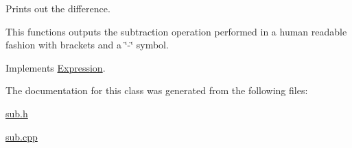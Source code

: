 Prints out the difference. 

This functions outputs the subtraction operation performed in a human readable fashion with brackets and a \char`\"{}-\/\char`\"{} symbol. 

Implements \hyperlink{class_expression_a6e05f883ebf77faf344dbaebfc82b3a0}{Expression}.



The documentation for this class was generated from the following files\+:\begin{DoxyCompactItemize}
\item 
\hyperlink{sub_8h}{sub.\+h}\item 
\hyperlink{sub_8cpp}{sub.\+cpp}\end{DoxyCompactItemize}
